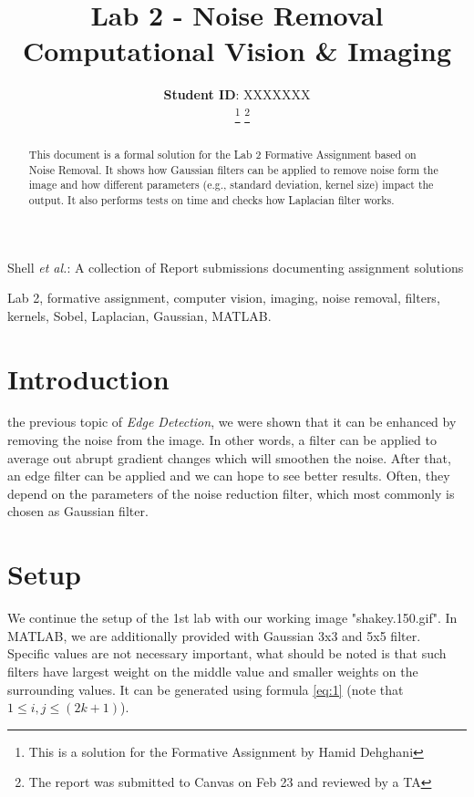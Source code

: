 \documentclass[lettersize,journal]{IEEEtran}
\begin{document}
\title{Lab 2 - Noise Removal \\ \vspace{0.1em} \LARGE Computational Vision \& Imaging}

\author{\textbf{Student ID}: XXXXXXX \\
~
\thanks{This is a solution for the Formative Assignment by Hamid Dehghani}
\thanks{The report was submitted to Canvas on Feb 23 and reviewed by a TA}}

%
{Shell \MakeLowercase{\textit{et al.}}: A collection of Report submissions documenting assignment solutions}

\maketitle

\begin{abstract}
This document is a formal solution for the Lab 2 Formative Assignment based on Noise Removal. It shows how Gaussian filters can be applied to remove noise form the image and how different parameters (e.g., standard deviation, kernel size) impact the output. It also performs tests on time and checks how Laplacian filter works.
\end{abstract}

\begin{IEEEkeywords}
Lab 2, formative assignment, computer vision, imaging, noise removal, filters, kernels, Sobel, Laplacian, Gaussian, MATLAB.
\end{IEEEkeywords}

\section{Introduction}
 the previous topic of \emph{Edge Detection}, we were shown that it can be enhanced by removing the noise from the image. In other words, a filter can be applied to average out abrupt gradient changes which will smoothen the noise. After that, an edge filter can be applied and we can hope to see better results. Often, they depend on the parameters of the noise reduction filter, which most commonly is chosen as Gaussian filter.

\section{Setup}
We continue the setup of the 1st lab with our working image "shakey.150.gif". In MATLAB, we are additionally provided with Gaussian 3x3 and 5x5 filter. Specific values are not necessary important, what should be noted is that such filters have largest weight on the middle value and smaller weights on the surrounding values. It can be generated using formula \ref{eq:1} (note that $1 \leq i, j \leq (2k + 1)$).
\end{document}
